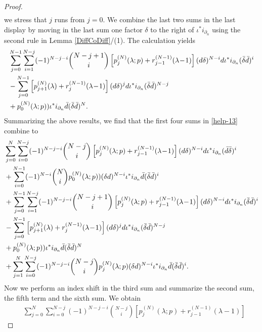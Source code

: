 \documentclass[a4paper,12pt,reqno]{amsart}
\numberwithin{theorem}{subsection}
\numberwithin{equation}{section}
\begin{document}
\begin{proof}
\begin{align*}
\end{align*}
we stress that $j$ runs from $j=0$. We combine the last two sums in the last
display by moving in the last sum one factor $\delta$ to the right of $\iota^*
i_{\partial_n}$ using the second rule in Lemma \ref{DiffCoDiff}/(1). The
calculation yields
\begin{align*}
   & \sum_{j=0}^{N-1} \sum_{i=1}^{N-j}(-1)^{N-j-i} \binom{N-j+1}{i}
   \left[p_j^{(N)}(\lambda;p) + r_{j-1}^{(N-1)}(\lambda\!-\!1)\right]
   ({d}\delta)^{N-i} {d} \iota^* i_{\partial_n} (\bar{\delta}\bar{d})^i \notag \\
   & - \sum_{j=0}^{N-1} \left[p_{j+1}^{(N)}(\lambda)+r_{j}^{(N-1)}(\lambda\!-\!1)\right]
   ({d} \delta)^{j} {d} \iota^* i_{\partial_n} (\bar{\delta}\bar{d})^{N-j} \\
   & + p_0^{(N)}(\lambda;p)) \iota^* i_{\partial_n} \bar{d} (\bar{\delta}\bar{d})^{N}.
\end{align*}
Summarizing the above results, we find that the first four sums in
\eqref{help-13} combine to
\begin{align*}
   & \sum_{j=0}^N \sum_{i=0}^{N-j}(-1)^{N-j-i} \binom{N-j}{i}
   \left[p_j^{(N)}(\lambda;p) + r_{j-1}^{(N-1)}(\lambda\!-\!1)\right]
   ({d}\delta)^{N-i} {d} \iota^* i_{\partial_n} (\bar{d}\bar{\delta})^i \\
   & + \sum_{i=0}^{N-1}(-1)^{N-i} \binom{N}{i} p_0^{(N)}(\lambda;p))(\delta{d})^{N-i}\iota^* i_{\partial_n}
   \bar{d}(\bar{\delta}\bar{d})^i \\
   & + \sum_{j=0}^{N-1} \sum_{i=1}^{N-j}(-1)^{N-j-i} \binom{N-j+1}{i}
   \left[p_j^{(N)}(\lambda;p) + r_{j-1}^{(N-1)}(\lambda\!-\!1)\right]
   ({d}\delta)^{N-i} {d} \iota^* i_{\partial_n} (\bar{\delta}\bar{d})^i \notag \\
   & - \sum_{j=0}^{N-1} \left[p_{j+1}^{(N)}(\lambda) + r_{j}^{(N-1)}(\lambda\!-\!1)\right]
   ({d} \delta)^{j} {d} \iota^* i_{\partial_n} (\bar{\delta}\bar{d})^{N-j} \\
   & + p_0^{(N)}(\lambda;p)) \iota^* i_{\partial_n} \bar{d} (\bar{\delta}\bar{d})^{N} \\
   & + \sum_{j=1}^N \sum_{i=0}^{N-j}(-1)^{N-j-i} \binom{N-j}{i} p_j^{(N)}(\lambda;p)
   (\delta{d})^{N-i} \iota^* i_{\partial_n} \bar{d}(\bar{\delta}\bar{d})^i.
\end{align*}
Now we perform an index shift in the third sum and summarize the second sum,
the fifth term and the sixth sum. We obtain
\begin{align*}
   & \sum_{j=0}^N \sum_{i=0}^{N-j}(-1)^{N-j-i} \binom{N-j}{i}
   \left[p_j^{(N)}(\lambda;p) + r_{j-1}^{(N-1)}(\lambda\!-\!1)\right]

\end{align*}
\end{proof}
\end{document}
